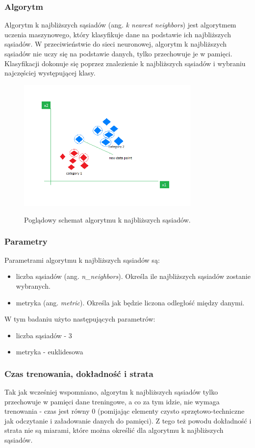 \subsubsection{Algorytm}\label{subsubsec:algorytm}
Algorytm k najbliższych sąsiadów (ang. \textit{k nearest neighbors}) jest algorytmem uczenia maszynowego, który klasyfikuje dane na podstawie ich najbliższych sąsiadów.
W przeciwieństwie do sieci neuronowej, algorytm k najbliższych sąsiadów nie uczy się na podstawie danych, tylko przechowuje je w pamięci.
Klasyfikacji dokonuje się poprzez znalezienie k najbliższych sąsiadów i wybraniu najczęściej występującej klasy.
\begin{figure}[H]
    \centering
    \includegraphics[width=0.8\textwidth]{img/knn.png}
    \caption{Poglądowy schemat algorytmu k najbliższych sąsiadów.}
    \cite{knn-GeeksforGeeks_2023} 
    \label{fig:knn}
\end{figure}
\subsubsection{Parametry}\label{subsubsec:parametry}
Parametrami algorytmu k najbliższych sąsiadów są:
\begin{itemize}
    \item liczba sąsiadów (ang. \textit{n\_neighbors}). Określa ile najbliższych sąsiadów zostanie wybranych.
    \item metryka (ang. \textit{metric}). Określa jak będzie liczona odległość między danymi.
\end{itemize}
W tym badaniu użyto następujących parametrów:
\begin{itemize}
    \item liczba sąsiadów - 3
    \item metryka - euklidesowa
\end{itemize}
\subsubsection{Czas trenowania, dokładność i strata}\label{subsubsec:czas_trenowania_knn}
Tak jak wcześniej wspomniano, algorytm k najbliższych sąsiadów tylko przechowuje w pamięci dane treningowe, a co za tym idzie, nie wymaga trenowania - czas jest równy 0 
(pomijając elementy czysto sprzętowo-techniczne jak odczytanie i załadowanie danych do pamięci).
Z tego też powodu dokładność i strata nie są miarami, które można określić dla algorytmu k najbliższych sąsiadów.
